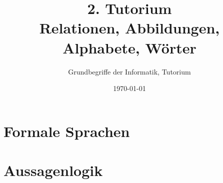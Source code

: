 




\title[Relationen, Abbildungen, Alphabete, Wörter]{2. Tutorium\\ Relationen, Abbildungen, Alphabete, Wörter}
\subtitle{Grundbegriffe der Informatik, Tutorium \hashtag\mytutnumber}
\date{\today}


\titleframe
\roadmap

\section{Formale Sprachen}


\section{Aussagenlogik}




